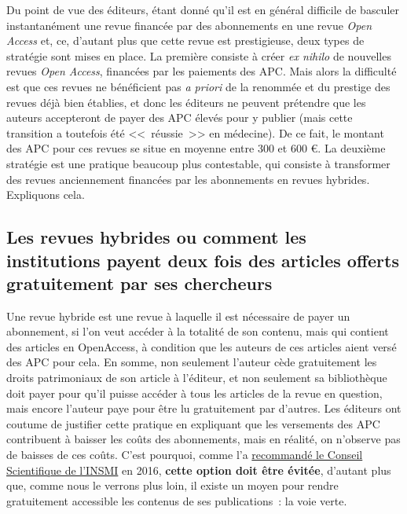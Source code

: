 Du point de vue des {\'e}diteurs, {\'e}tant donn{\'e} qu'il est en g{\'e}n{\'e}ral difficile de basculer instantan{\'e}ment une revue financ{\'e}e par des abonnements en une
revue \emph{Open Access} et, ce, d'autant plus que cette revue est prestigieuse, deux types de strat{\'e}gie sont mises en place. La premi{\`e}re consiste {\`a} cr{\'e}er
\emph{ex nihilo} de nouvelles revues \emph{Open Access}, financ{\'e}es par les paiements des APC. Mais alors la difficult{\'e} est que ces revues ne b{\'e}n{\'e}ficient pas
\emph{a priori} de la renomm{\'e}e et du prestige des revues d{\'e}j{\`a} bien {\'e}tablies, et donc les {\'e}diteurs ne peuvent pr{\'e}tendre que les auteurs accepteront de payer
des APC {\'e}lev{\'e}s pour y publier (mais cette transition a toutefois {\'e}t{\'e} <<~r{\'e}ussie~>> en m{\'e}decine). De ce fait, le montant des APC pour ces revues se situe
en moyenne entre 300 et 600 \euro. La deuxi{\`e}me strat{\'e}gie est une pratique beaucoup plus contestable, qui consiste {\`a} transformer des revues anciennement
financ{\'e}es par les abonnements en revues hybrides. Expliquons cela.

\subsection{Les revues hybrides ou comment les institutions payent deux fois des articles offerts gratuitement par ses chercheurs}

Une revue hybride est une revue {\`a} laquelle il est n{\'e}cessaire de payer un abonnement, si l'on veut acc{\'e}der {\`a} la totalit{\'e} de son contenu, mais qui contient
des articles en OpenAccess, {\`a} condition que les auteurs de ces articles aient vers{\'e} des APC pour cela. En somme, non seulement l'auteur c{\`e}de gratuitement
les droits patrimoniaux de son article {\`a} l'{\'e}diteur, et non seulement sa biblioth{\`e}que doit payer pour qu'il puisse acc{\'e}der {\`a} tous les articles de la revue
en question, mais encore l'auteur paye pour {\^e}tre lu gratuitement par d'autres. Les {\'e}diteurs ont coutume de justifier cette pratique en expliquant que les
versements des APC contribuent {\`a} baisser les co{\^u}ts des abonnements, mais en r{\'e}alit{\'e}, on n'observe pas de baisses de ces co{\^u}ts. C'est pourquoi,
comme l'a
\href{http://www.cnrs.fr/comitenational/doc/recommandations/2016/Recommandation-csi-INSMI-au-sujet-des-frais-de-publication-(APC).pdf}{recommand{\'e} le Conseil Scientifique de l'INSMI}
en 2016, \textbf{cette option doit {\^e}tre {\'e}vit{\'e}e},
d'autant plus que, comme nous le verrons plus loin, il existe
un moyen pour rendre gratuitement accessible les contenus de ses publications~: la voie verte.

